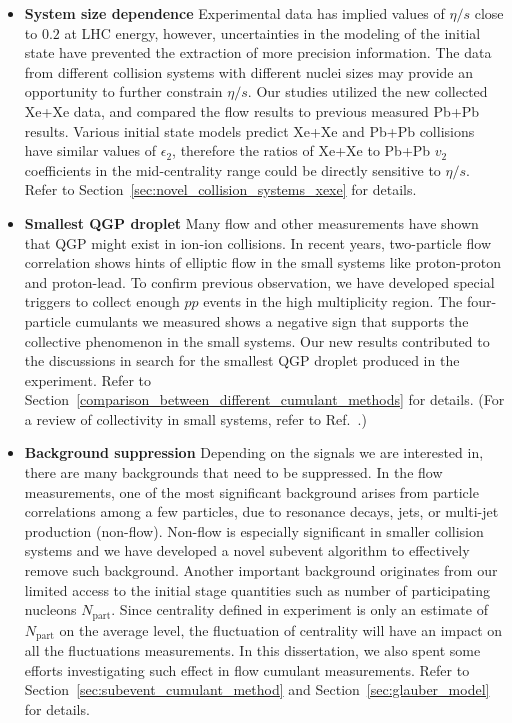 \begin{itemize}
\item \textbf{System size dependence} Experimental data has implied values of $\eta/s$ close to $0.2$ at LHC energy, however, uncertainties in the modeling of the initial state have prevented the extraction of more precision information. The data from different collision systems with different nuclei sizes may provide an opportunity to further constrain $\eta/s$. Our studies utilized the new collected Xe+Xe data, and compared the flow results to previous measured Pb+Pb results. Various initial state models predict Xe+Xe and Pb+Pb collisions have similar values of $\epsilon_2$, therefore the ratios of Xe+Xe to Pb+Pb $v_2$ coefficients in the mid-centrality range could be directly sensitive to $\eta/s$. Refer to Section~\ref{sec:novel_collision_systems_xexe} for details.
\item \textbf{Smallest QGP droplet} Many flow and other measurements have shown that QGP might exist in ion-ion collisions. In recent years, two-particle flow correlation shows hints of elliptic flow in the small systems like proton-proton and proton-lead. To confirm previous observation, we have developed special triggers to collect enough $pp$ events in the high multiplicity region. The four-particle cumulants we measured shows a negative sign that supports the collective phenomenon in the small systems. Our new results contributed to the discussions in search for the smallest QGP droplet produced in the experiment. Refer to Section~\ref{comparison_between_different_cumulant_methods} for details. (For a review of collectivity in small systems, refer to Ref.~\cite{Nagle:2018nvi}.)
\item \textbf{Background suppression} Depending on the signals we are interested in, there are many backgrounds that need to be suppressed. In the flow measurements, one of the most significant background arises from particle correlations among a few particles, due to resonance decays, jets, or multi-jet production (non-flow). Non-flow is especially significant in smaller collision systems and we have developed a novel subevent algorithm to effectively remove such background. Another important background originates from our limited access to the initial stage quantities such as number of participating nucleons $N_\text{part}$. Since centrality defined in experiment is only an estimate of $N_\text{part}$ on the average level, the fluctuation of centrality will have an impact on all the fluctuations measurements. In this dissertation, we also spent some efforts investigating such effect in flow cumulant measurements. Refer to Section~\ref{sec:subevent_cumulant_method} and Section~\ref{sec:glauber_model} for details.
\end{itemize}



